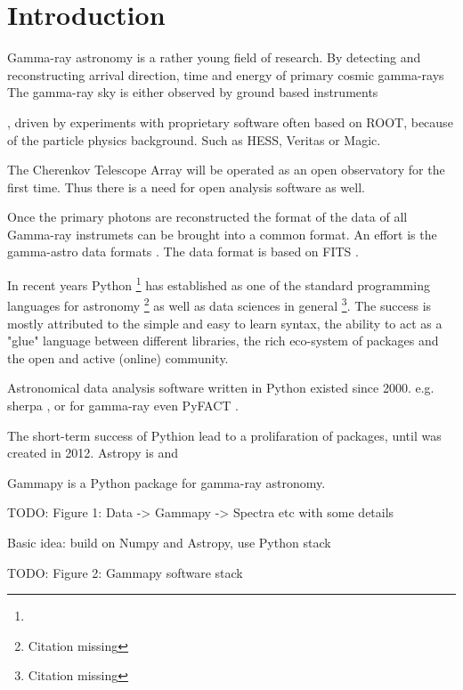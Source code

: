\section{Introduction}
\label{sec:intro}


Gamma-ray astronomy is a rather young field of research.
By detecting and reconstructing arrival direction, time and energy
of primary cosmic gamma-rays
The gamma-ray sky is either observed by ground based instruments

, driven by experiments with proprietary software often based
on ROOT, because of the particle physics background. Such 
as HESS, Veritas or Magic.

The Cherenkov Telescope Array will be operated as an open
observatory for the first time. Thus there is a need for
open analysis software as well.

Once the primary photons are reconstructed the format of the data
of all Gamma-ray instrumets can be brought into a common format.
An effort is the gamma-astro data formats \cite{gadf-zenodo}.
The data format is based on FITS  \citep{fits}.


In recent years Python \footnote{\PythonUrl} has established as one of the
standard programming  languages for astronomy \footnote{Citation missing}
as well as data sciences in  general \footnote{Citation missing}.
The success is mostly attributed to the simple and easy to learn syntax,
the ability to act as a "glue" language between different libraries,
the rich eco-system of packages and the open and active (online) community.

Astronomical data analysis software written in Python existed since 2000.
e.g. sherpa \citep{sherpa-2011, sherpa-2009}, or for gamma-ray even
PyFACT \citep{pyfact}.

The short-term success of Pythion lead to a prolifaration of packages, until
\astropy \citep{astropy} was created in 2012. Astropy is and


Gammapy is a Python package for gamma-ray astronomy.



TODO: Figure 1: Data -> Gammapy -> Spectra etc with some details 

Basic idea: build on Numpy and Astropy, use Python stack

TODO: Figure 2: Gammapy software stack


